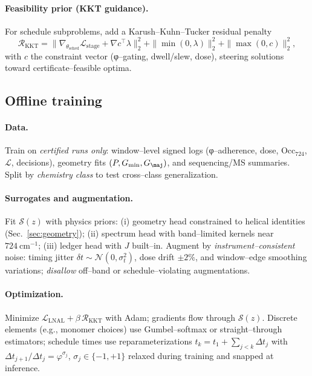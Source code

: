 \documentclass[11pt]{article}
\begin{document}
\paragraph{Feasibility prior (KKT guidance).}
For schedule subproblems, add a Karush–Kuhn–Tucker residual penalty
\[
\mathcal{R}_{\mathrm{KKT}}=\big\|\nabla_{\theta_{\mathrm{sched}}}\mathcal{L}_{\mathrm{stage}}+\nabla c^\top\lambda\big\|_2^2
+\|\min(0,\lambda)\|_2^2+\|\max(0,c)\|_2^2,
\]
with $c$ the constraint vector (φ–gating, dwell/slew, dose), steering solutions toward certificate–feasible optima.

\subsection{Offline training}\label{sec:lnal-offline}
\paragraph{Data.}
Train on \emph{certified runs only}: window–level signed logs (φ–adherence, dose, $\mathrm{Occ}_{724}$, $\mathcal{L}$, decisions), geometry fits $(P,G_{\min},G_{\maj})$, and sequencing/MS summaries. Split by \emph{chemistry class} to test cross–class generalization.

\paragraph{Surrogates and augmentation.}
Fit $\mathcal{S}(z)$ with physics priors: (i) geometry head constrained to helical identities (Sec.~\ref{sec:geometry}); (ii) spectrum head with band–limited kernels near $724~\mathrm{cm^{-1}}$; (iii) ledger head with $J$ built–in. Augment by \emph{instrument–consistent} noise: timing jitter $\delta t\sim\mathcal{N}(0,\sigma_t^2)$, dose drift $\pm 2\%$, and window–edge smoothing variations; \emph{disallow} off–band or schedule–violating augmentations.

\paragraph{Optimization.}
Minimize $\mathcal{L}_{\mathrm{LNAL}}+\beta\,\mathcal{R}_{\mathrm{KKT}}$ with Adam; gradients flow through $\mathcal{S}(z)$. Discrete elements (e.g., monomer choices) use Gumbel–softmax or straight–through estimators; schedule times use reparameterizations $t_k=t_1+\sum_{j<k}\Delta t_j$ with $\Delta t_{j+1}/\Delta t_j=\varphi^{\sigma_j}$, $\sigma_j\in\{-1,+1\}$ relaxed during training and snapped at inference.
\end{document}
